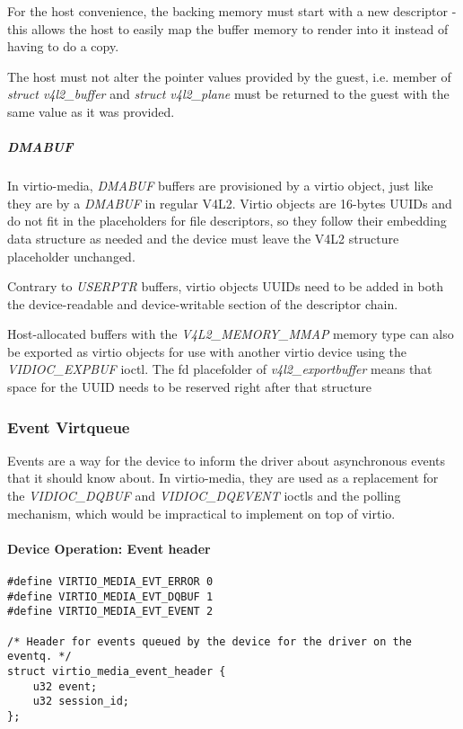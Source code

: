 For the host convenience, the backing memory must start with a new descriptor
- this allows the host to easily map the buffer memory to render into it
instead of having to do a copy.

The host must not alter the pointer values provided by the guest, i.e.
 member of \textit{struct v4l2_buffer} and
\textit{struct v4l2_plane} must be returned to the guest with the same value
as it was provided.

\subparagraph{DMABUF}

In virtio-media, \textit{DMABUF} buffers are provisioned by a virtio object,
just like they are by a \textit{DMABUF} in regular V4L2. Virtio objects are
16-bytes UUIDs and do not fit in the placeholders for file descriptors, so
they follow their embedding data structure as needed and the device must
leave the V4L2 structure placeholder unchanged.

Contrary to \textit{USERPTR} buffers, virtio objects UUIDs need to be added in
both the device-readable and device-writable section of the descriptor chain.

Host-allocated buffers with the \textit{V4L2_MEMORY_MMAP} memory type can also
be exported as virtio objects for use with another virtio device using the
\textit{VIDIOC_EXPBUF} ioctl. The fd placefolder of \textit{v4l2_exportbuffer}
means that space for the UUID needs to be reserved right after that structure

\subsubsection{Event Virtqueue}

Events are a way for the device to inform the driver about asynchronous events
that it should know about. In virtio-media, they are used as a replacement for
the \textit{VIDIOC_DQBUF} and \textit{VIDIOC_DQEVENT} ioctls and the polling
mechanism, which would be impractical to implement on top of virtio.

\paragraph{Device Operation: Event header}

\begin{lstlisting}
#define VIRTIO_MEDIA_EVT_ERROR 0
#define VIRTIO_MEDIA_EVT_DQBUF 1
#define VIRTIO_MEDIA_EVT_EVENT 2

/* Header for events queued by the device for the driver on the eventq. */
struct virtio_media_event_header {
    u32 event;
    u32 session_id;
};
\end{lstlisting}

